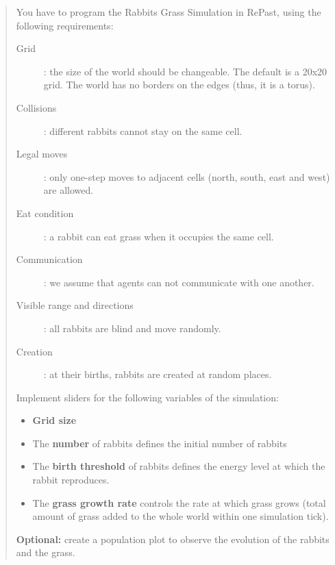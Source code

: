 \documentclass[10pt,a4paper]{article}
\begin{document}
\begin{quote}
{    You have to program the Rabbits Grass Simulation in RePast, using the following requirements:

    \begin{description}
        \item[Grid]: the size of the world should be changeable. The default is
        a 20x20 grid. The world has no borders on the edges (thus, it is a
        torus).

        \item[Collisions]: different rabbits cannot stay on the same cell.

        \item[Legal moves]: only one-step moves to adjacent cells (north,
        south, east and west) are allowed.

        \item[Eat condition]: a rabbit can eat grass when it occupies the same
        cell.

        \item[Communication]: we assume that agents can not communicate with
        one another.

        \item[Visible range and directions]: all rabbits are blind and move
        randomly.

        \item[Creation]: at their births, rabbits are created at random places.

    \end{description}

    Implement sliders for the following variables of the simulation:

    \begin{itemize}
        \item \textbf{Grid size}
        \item The \textbf{number} of rabbits defines the initial number of
        rabbits

        \item The \textbf{birth threshold} of rabbits defines the energy level
        at which the rabbit reproduces.

        \item The \textbf{grass growth rate} controls the rate at which grass
        grows (total amount of grass added to the whole world within one simulation tick).
    \end{itemize}

    \textbf{Optional:} create a population plot to observe the evolution of the
    rabbits and the grass.
}\end{quote}
\end{document}
